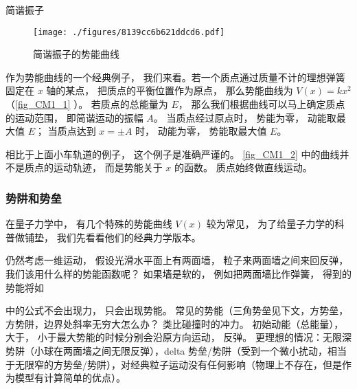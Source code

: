 
\begin{example}{简谐振子}\label{ex_CM1_1}
\begin{figure}[ht]
\centering
\texttt{[image: ./figures/8139cc6b621ddcd6.pdf]}
\caption{简谐振子的势能曲线} \label{fig_CM1_2}
\end{figure}

作为势能曲线的一个经典例子， 我们来看。若一个质点通过质量不计的理想弹簧固定在 $x$ 轴的某点， 把质点的平衡位置作为原点， 那么势能曲线为 $V(x) = kx^2$（\autoref{fig_CM1_1} ）。 若质点的总能量为 $E$， 那么我们根据曲线可以马上确定质点的运动范围， 即简谐运动的振幅 $A$。 当质点经过原点时， 势能为零， 动能取最大值 $E$； 当质点达到 $x = \pm A$ 时， 动能为零， 势能取最大值 $E$。
\end{example}
相比于上面小车轨道的例子， 这个例子是准确严谨的。 \autoref{fig_CM1_2} 中的曲线并不是质点的运动轨迹， 而是势能关于 $x$ 的函数。 质点始终做直线运动。

\subsubsection{势阱和势垒}
在量子力学中， 有几个特殊的势能曲线 $V(x)$ 较为常见， 为了给量子力学的科普做铺垫， 我们先看看他们的经典力学版本。



仍然考虑一维运动， 假设光滑水平面上有两面墙， 粒子来两面墙之间来回反弹， 我们该用什么样的势能函数呢？ 如果墙是软的， 例如把两面墙比作弹簧， 得到的势能将如

中的公式不会出现力， 只会出现势能。 常见的势能（三角势垒见下文，方势垒，方势阱，边界处斜率无穷大怎么办？ 类比碰撞时的冲力。 初始动能（总能量）， 大于， 小于最大势能的时候分别会沿原方向运动， 反弹。 更理想的情况：无限深势阱（小球在两面墙之间无限反弹），delta 势垒/势阱（受到一个微小扰动，相当于无限窄的方势垒/势阱），对经典粒子运动没有任何影响（物理上不存在，但是作为模型有计算简单的优点）。
